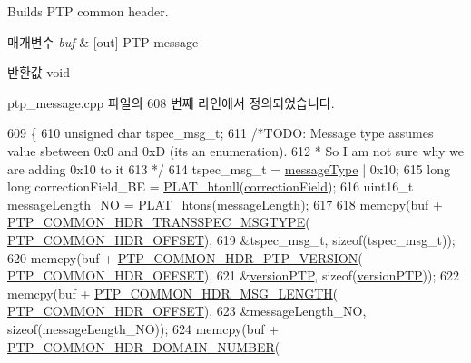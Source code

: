 Builds P\+TP common header. 


\begin{DoxyParams}{매개변수}
{\em buf} & \mbox{[}out\mbox{]} P\+TP message \\
\hline
\end{DoxyParams}
\begin{DoxyReturn}{반환값}
void 
\end{DoxyReturn}


ptp\+\_\+message.\+cpp 파일의 608 번째 라인에서 정의되었습니다.


\begin{DoxyCode}
609 \{
610     \textcolor{keywordtype}{unsigned} \textcolor{keywordtype}{char} tspec\_msg\_t;
611     \textcolor{comment}{/*TODO: Message type assumes value sbetween 0x0 and 0xD (its an enumeration).}
612 \textcolor{comment}{     * So I am not sure why we are adding 0x10 to it}
613 \textcolor{comment}{     */}
614     tspec\_msg\_t = \hyperlink{class_p_t_p_message_common_adb32627aa5b0e2dbad3ccd88aab07c05}{messageType} | 0x10;
615     \textcolor{keywordtype}{long} \textcolor{keywordtype}{long} correctionField\_BE = \hyperlink{linux_2src_2platform_8cpp_af650711ffc00c79514542fa37c393871}{PLAT\_htonll}(\hyperlink{class_p_t_p_message_common_a635b707dac6610b5b159be5c8ec1891e}{correctionField});
616     uint16\_t messageLength\_NO = \hyperlink{linux_2src_2platform_8cpp_aa89fc0aa7465274c200da69771d2a043}{PLAT\_htons}(\hyperlink{class_p_t_p_message_common_a6c490faee54bca860c4d897aae50990f}{messageLength});
617 
618     memcpy(buf + \hyperlink{avbts__message_8hpp_a102fc939e55e08eadb9bf42508fb65d2}{PTP\_COMMON\_HDR\_TRANSSPEC\_MSGTYPE}(
      \hyperlink{avbts__message_8hpp_a330dd502b6e19949d74c8f3a96dd5667}{PTP\_COMMON\_HDR\_OFFSET}),
619            &tspec\_msg\_t, \textcolor{keyword}{sizeof}(tspec\_msg\_t));
620     memcpy(buf + \hyperlink{avbts__message_8hpp_a4b78a578ef002737321ef5c6def6593e}{PTP\_COMMON\_HDR\_PTP\_VERSION}(
      \hyperlink{avbts__message_8hpp_a330dd502b6e19949d74c8f3a96dd5667}{PTP\_COMMON\_HDR\_OFFSET}),
621            &\hyperlink{class_p_t_p_message_common_aebd1e0693c6170ff1b08b2471db92a80}{versionPTP}, \textcolor{keyword}{sizeof}(\hyperlink{class_p_t_p_message_common_aebd1e0693c6170ff1b08b2471db92a80}{versionPTP}));
622     memcpy(buf + \hyperlink{avbts__message_8hpp_a6db27d50a88956a08a99f2eb7b020247}{PTP\_COMMON\_HDR\_MSG\_LENGTH}(
      \hyperlink{avbts__message_8hpp_a330dd502b6e19949d74c8f3a96dd5667}{PTP\_COMMON\_HDR\_OFFSET}),
623            &messageLength\_NO, \textcolor{keyword}{sizeof}(messageLength\_NO));
624     memcpy(buf + \hyperlink{avbts__message_8hpp_aeba19234aadc9ec2ce3ec7b439a79c54}{PTP\_COMMON\_HDR\_DOMAIN\_NUMBER}(

\end{DoxyCode}
